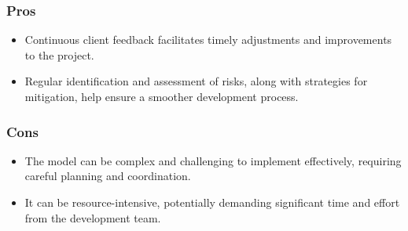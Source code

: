 \subsubsection{Pros}
\begin{itemize} 
\item Continuous client feedback facilitates timely adjustments and improvements to the project.
\item Regular identification and assessment of risks, along with strategies for mitigation, help ensure a smoother development
process. 
\end{itemize}
\subsubsection{Cons}
\begin{itemize} 
\item The model can be complex and challenging to implement effectively, requiring careful planning and coordination.
\item It can be resource-intensive, potentially demanding significant time and effort from the development team.
\end{itemize}
\vspace{1cm}
